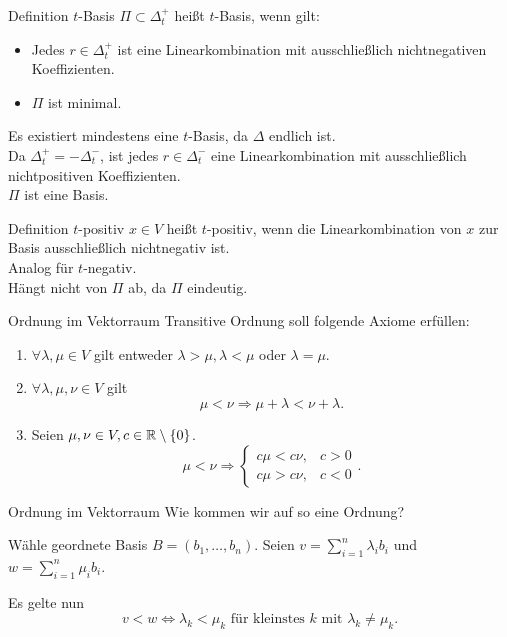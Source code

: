 \documentclass[18pt,draft]{beamer}
\begin{document}
\begin{frame}{Definition \( t \)-Basis}
    \( \Pi \subset \Delta_t^+ \) heißt \( t \)-Basis, 
    wenn gilt:
    \begin{itemize}
        \item Jedes \( r \in \Delta_t^+ \) ist 
        eine Linearkombination mit ausschließlich 
        nichtnegativen Koeffizienten.
        \item \( \Pi \) ist minimal.
    \end{itemize}
    Es existiert mindestens eine \( t \)-Basis, 
    da \( \Delta \) endlich ist.\\
    Da \( \Delta_t^+ = - \Delta_t^- \), ist jedes 
    \( r \in \Delta_t^- \) eine Linearkombination 
    mit ausschließlich nichtpositiven Koeffizienten.\\
    \( \Pi \) ist eine Basis. %
\end{frame}

\begin{frame}{Definition \(t\)-positiv}
    \( x \in V \) heißt \(t\)-positiv, wenn 
    die Linearkombination von \(x\) zur 
    Basis ausschließlich nichtnegativ ist.\\
    Analog für \( t \)-negativ.\\
    Hängt nicht von \( \Pi \) ab, da \( \Pi \) 
    eindeutig.
\end{frame}


\begin{frame}{Ordnung im Vektorraum}
    Transitive Ordnung soll folgende Axiome erfüllen:
    \begin{enumerate}
        \item \( \forall \lambda, \mu \in V \) gilt 
        entweder \( \lambda > \mu, \lambda < \mu \) 
        oder \( \lambda = \mu \).
        \item \( \forall \lambda, \mu, \nu \in V \) 
        gilt 
        \[ \mu < \nu 
        \Rightarrow \mu + \lambda < \nu + \lambda. \]
        \item Seien \( \mu, \nu \in V, 
        c \in \mathbb{R} \setminus \{0\} \).
        \[ \mu < \nu \Rightarrow 
        \begin{cases}
            c \mu < c \nu, & c > 0 \\
            c \mu > c \nu, & c < 0
        \end{cases}. \]
    \end{enumerate}
\end{frame}
\begin{frame}{Ordnung im Vektorraum}
    Wie kommen wir auf so eine Ordnung?

    Wähle geordnete Basis 
    \( B = (b_1, \ldots, b_n) \). 
    Seien \( v = \sum_{i=1}^n \lambda_i b_i \)
    und \( w = \sum_{i=1}^n \mu_i b_i \).
    
    Es gelte nun
    \[ v < w \Leftrightarrow
    \lambda_k < \mu_k \text{ für kleinstes } k \text{ mit } 
    \lambda_k \neq \mu_k. \]
\end{frame}
\end{document}
